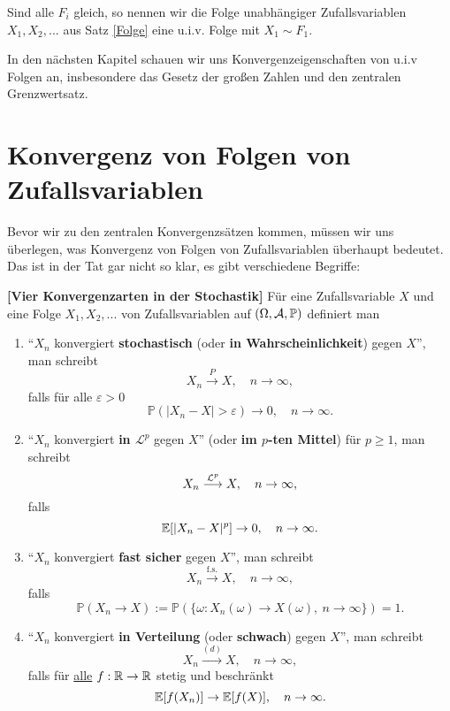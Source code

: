 \begin{deff}
	Sind alle $F_i$ gleich, so nennen wir die Folge unabh\"angiger Zufallsvariablen $X_1,X_2,...$ aus Satz \ref{Folge} eine u.i.v. Folge mit $X_1 \sim F_1$.
\end{deff}
In den n\"achsten Kapitel schauen wir uns Konvergenzeigenschaften von u.i.v Folgen an, insbesondere das Gesetz der gro\ss en Zahlen und den zentralen Grenzwertsatz.

\section{Konvergenz von Folgen von Zufallsvariablen}\label{sec:konvergenz}
Bevor wir zu den zentralen Konvergenzs\"atzen kommen, m\"ussen wir uns \"uberlegen, was Konvergenz von Folgen von Zufallsvariablen \"uberhaupt bedeutet. Das ist in der Tat gar nicht so klar, es gibt verschiedene Begriffe:
\begin{deff}\label{Konvergenzarten}
 \textbf{[Vier Konvergenzarten in der Stochastik]}
	Für eine Zufallsvariable $X$ und eine Folge $X_1,X_2,...$ von Zufallsvariablen auf $(\Omega, \mathcal{A}, \mathbb{P})$  definiert man
	\begin{enumerate}[label=(\roman*)]
		\item \enquote{$X_n$ konvergiert \textbf{stochastisch} (oder \textbf{in Wahrscheinlichkeit}) gegen $X$}, man schreibt		
		$$X_n \overset{P}{\longrightarrow} X, \quad n \to \infty,$$ falls f\"ur alle $\varepsilon>0$ $$\mathbb{P}(|X_n-X|>\varepsilon) \to 0, \quad n \to \infty.$$
		\item \enquote{$X_n$ konvergiert \textbf{in $\mathcal L^p$} gegen $X$} (oder \textbf{im $p$-ten Mittel}) f\"ur $p\geq 1$, man schreibt
		$$X_n \overset{\mathcal{L}^p}{\longrightarrow} X, \quad n \to \infty,$$ falls $$\mathbb{E}[|X_n - X|^p] \to 0, \quad n \to \infty.$$
		\item 
		\enquote{$X_n$ konvergiert \textbf{fast sicher} gegen $X$}, man schreibt
		$$X_n \overset{\text{f.s.}}{\longrightarrow} X, \quad n \to \infty,$$ falls $$\mathbb{P}(X_n \to X) := \mathbb{P}(\{ \omega\colon X_n(\omega) \to X(\omega), \: n\to \infty \}) = 1.$$
		\item 
		 \enquote{$X_n$ konvergiert  \textbf{in Verteilung} (oder \textbf{schwach}) gegen $X$}, man schreibt		
		$$X_n \overset{(d)}{\longrightarrow} X, \quad n \to \infty,$$ falls f\"ur \underline{alle} $f:\mathbb{R}\to\mathbb{R}$ stetig und beschr\"ankt
		$$\mathbb{E}[f(X_n)] \to \mathbb{E}[f(X)], \quad n\to\infty.$$
	\end{enumerate}
\end{deff}
